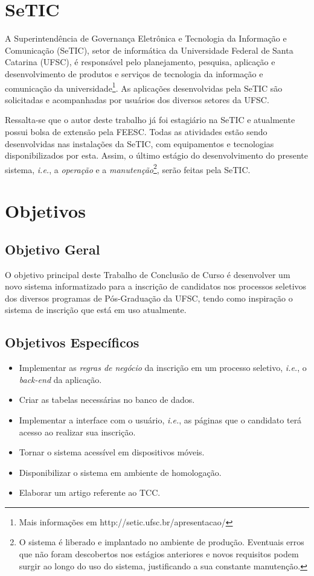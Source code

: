 \documentclass[
  10.5pt,				  %
	openright,			%
	twoside,			  %
  a5paper,
  chapter=TITLE,	%
	section=TITLE,	%
  hyphens,        %
	english,        %
	brazil          %
]{abntex2}
\begin{document}
\section{SeTIC}

A Superintendência de Governança Eletrônica e Tecnologia da Informação e Comunicação (SeTIC), setor de informática da Universidade Federal de Santa Catarina (UFSC), é responsável pelo planejamento, pesquisa, aplicação e desenvolvimento de produtos e serviços de tecnologia da informação e comunicação da universidade\footnote{Mais informações em http://setic.ufsc.br/apresentacao/}. As aplicações desenvolvidas pela SeTIC são solicitadas e acompanhadas por usuários dos diversos setores da UFSC.

Ressalta-se que o autor deste trabalho já foi estagiário na SeTIC e atualmente possui bolsa de extensão pela FEESC. Todas as atividades estão sendo desenvolvidas nas instalações da SeTIC, com equipamentos e tecnologias disponibilizados por esta. Assim, o último estágio do desenvolvimento do presente sistema, \emph{i.e.}, a \emph{operação} e a \emph{manutenção}\footnote{O sistema é liberado e implantado no ambiente de produção. Eventuais erros que não foram descobertos nos estágios anteriores e novos requisitos podem surgir ao longo do uso do sistema, justificando a sua constante manutenção.}, serão feitas pela SeTIC.

\section{Objetivos}

\subsection{Objetivo Geral}
O objetivo principal deste Trabalho de Conclusão de Curso é desenvolver um novo sistema informatizado para a inscrição de candidatos nos processos seletivos dos diversos programas de Pós-Graduação da UFSC, tendo como inspiração o sistema de inscrição que está em uso atualmente.

\subsection{Objetivos Específicos}
\begin{itemize}
  \item Implementar as \emph{regras de negócio} da inscrição em um processo seletivo, \emph{i.e.}, o \emph{back-end} da aplicação.
  \item Criar as tabelas necessárias no banco de dados.
  \item Implementar a interface com o usuário, \emph{i.e.}, as páginas que o candidato terá acesso ao realizar sua inscrição.
  \item Tornar o sistema acessível em dispositivos móveis.
  \item Disponibilizar o sistema em ambiente de homologação.
  \item Elaborar um artigo referente ao TCC.
\end{itemize}
\end{document}
